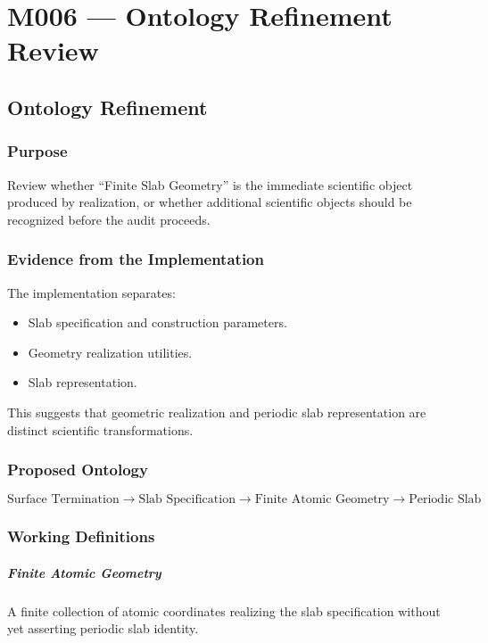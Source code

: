 \chapter{M006 --- Ontology Refinement Review}

\section{Ontology Refinement}

\subsection{Purpose}

Review whether ``Finite Slab Geometry'' is the immediate scientific
object produced by realization, or whether additional scientific objects
should be recognized before the audit proceeds.

\subsection{Evidence from the Implementation}

The implementation separates:

\begin{itemize}
\item Slab specification and construction parameters.
\item Geometry realization utilities.
\item Slab representation.
\end{itemize}

This suggests that geometric realization and periodic slab
representation are distinct scientific transformations.

\subsection{Proposed Ontology}

\[
\text{Surface Termination}
\rightarrow
\text{Slab Specification}
\rightarrow
\text{Finite Atomic Geometry}
\rightarrow
\text{Periodic Slab}
\]

\subsection{Working Definitions}

\paragraph{Finite Atomic Geometry}
A finite collection of atomic coordinates realizing the slab
specification without yet asserting periodic slab identity.

